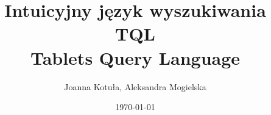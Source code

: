 \documentclass[xcolor=dvipsnames,10pt]{beamer}
\author{Joanna Kotuła, Aleksandra Mogielska}
\institute[...]{Wydział Matematyki, Informatyki i Mechaniki\\
Uniwersytet Warszawski}
\title[Intuicyjny język wyszukiwania TQL (Tablets Query Language)]{\bf  Intuicyjny język wyszukiwania TQL \\
Tablets Query Language}
\date{\today}
\begin{document}
\begin{frame}
     \titlepage
\end{frame}

%    
% 
% 






% 

\end{document}
